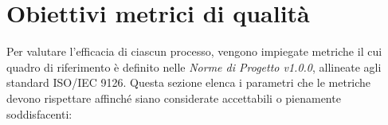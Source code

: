 \section{Obiettivi metrici di qualità}
Per valutare l'efficacia di ciascun processo, vengono impiegate metriche il cui quadro di riferimento è definito nelle \textit{Norme di Progetto v1.0.0}, allineate agli standard ISO/IEC 9126. Questa sezione elenca i parametri che le metriche devono rispettare affinché siano considerate accettabili o pienamente soddisfacenti:






